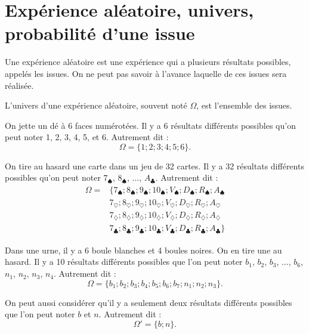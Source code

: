 \documentclass[a4paper,11pt,DIV12,BCOR0mm]{scrartcl}
\begin{document}
\section{Expérience aléatoire, univers, probabilité d'une issue}
Une expérience aléatoire est une expérience qui a plusieurs résultats possibles, appelés
les issues. On ne peut pas savoir à l'avance laquelle de ces issues sera réalisée.

L'univers d'une expérience aléatoire, souvent noté $\Omega$, est l'ensemble
des issues.
\begin{exemple}
 \label{ex:de}On jette un dé à 6 faces numérotées. Il y a 6 résultats différents 
possibles qu'on peut noter 1, 2, 3, 4, 5, et 6. Autrement dit :
\[\Omega=\{1;2;3;4;5;6\}.\]
\end{exemple}
\begin{exemple}
 \label{ex:cartes}On tire au hasard une carte dans un jeu de 32 cartes. Il y a 32 résultats différents possibles qu'on peut noter 
$7_{\spadesuit}$, $8_{\spadesuit}$, ..., $A_{\clubsuit}$. Autrement dit :
\begin{align*}
 \Omega=&\{	7_{\spadesuit};8_{\spadesuit};9_{\spadesuit};10_{\spadesuit};
		V_{\spadesuit};D_{\spadesuit};R_{\spadesuit};A_{\spadesuit}\\
	&	7_{\heartsuit};8_{\heartsuit};9_{\heartsuit};10_{\heartsuit};
		V_{\heartsuit};D_{\heartsuit};R_{\heartsuit};A_{\heartsuit}\\
	&	7_{\diamondsuit};8_{\diamondsuit};9_{\diamondsuit};10_{\diamondsuit};
		V_{\diamondsuit};D_{\diamondsuit};R_{\diamondsuit};A_{\diamondsuit}\\
	&	7_{\clubsuit};8_{\clubsuit};9_{\clubsuit};10_{\clubsuit};
		V_{\clubsuit};D_{\clubsuit};R_{\clubsuit};A_{\clubsuit}\}
\end{align*}
\end{exemple}
\begin{exemple}
 \label{ex:urne}Dans une urne, il y a 6 boule blanches et 4 boules noires. On en tire une au hasard. Il y a 10 résultats différents
possibles que l'on peut noter $b_1$, $b_2$, $b_3$, ..., $b_6$, $n_1$, $n_2$, $n_3$, $n_4$. Autrement dit :
\[
 \Omega=\{b_1;b_2;b_3;b_4;b_5;b_6;b_7;n_1;n_2;n_3\}.
\]


On peut aussi considérer qu'il y a seulement deux résultats différents possibles 
que l'on peut noter $b$ et $n$. Autrement dit :
\[
 \Omega'=\{b;n\}.
\]

\end{exemple}
\end{document}
